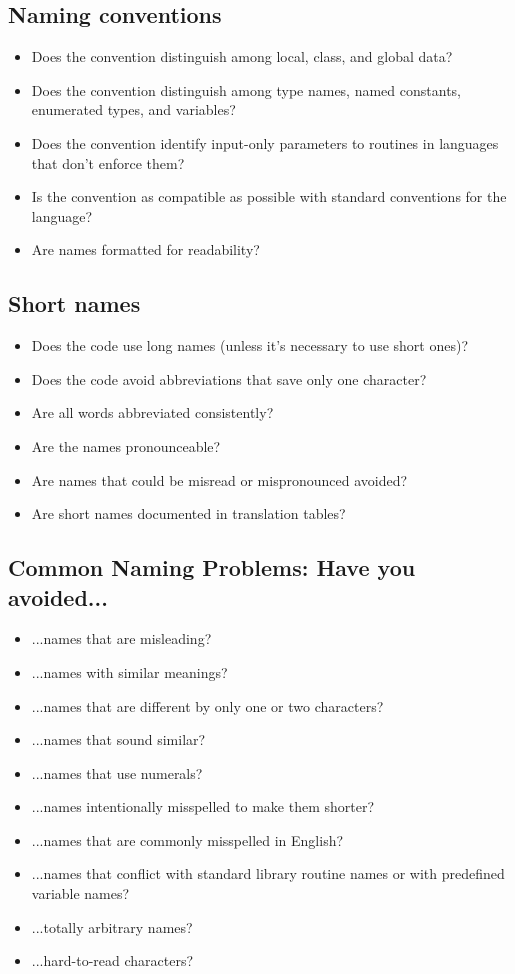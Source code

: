 \subsection{Naming conventions}
\begin{itemize}
\item Does the convention distinguish among local, class, and global data?
\item Does the convention distinguish among type names, named constants, enumerated types, and variables?
\item Does the convention identify input-only parameters to routines in languages that don’t enforce them?
\item Is the convention as compatible as possible with standard conventions for the language?
\item Are names formatted for readability?
\end{itemize}

\subsection{Short names}
\begin{itemize}
\item Does the code use long names (unless it’s necessary to use short ones)?
\item Does the code avoid abbreviations that save only one character?
\item Are all words abbreviated consistently?
\item Are the names pronounceable?
\item Are names that could be misread or mispronounced avoided?
\item Are short names documented in translation tables?
\end{itemize}

\subsection{Common Naming Problems: Have you avoided...}
\begin{itemize}
\item ...names that are misleading?
\item ...names with similar meanings?
\item ...names that are different by only one or two characters?
\item ...names that sound similar?
\item ...names that use numerals?
\item ...names intentionally misspelled to make them shorter?
\item ...names that are commonly misspelled in English?
\item ...names that conflict with standard library routine names or with predefined variable names?
\item ...totally arbitrary names?
\item ...hard-to-read characters?
\end{itemize}

